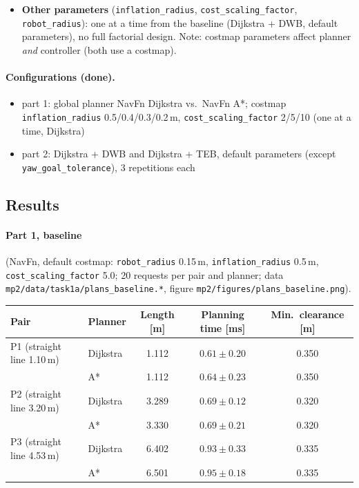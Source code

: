 \documentclass[10pt]{article}
\newcommand{\pkg}[1]{\texttt{#1}}
\begin{document}
\begin{itemize}
\begin{itemize}
                valid), recoveries, goal aborted. Weakness of plan-once; with 1\,Hz replanning this would not occur.
          \item \pkg{xy\_goal\_tolerance} 0.25\,m kept: start and end of a run differ from the pair coordinates
                by up to 0.25\,m, so the planned lengths differ from part 1.
        \end{itemize}
  \item \textbf{Other parameters} (\pkg{inflation\_radius}, \pkg{cost\_scaling\_factor}, \pkg{robot\_radius}):
        one at a time from the baseline (Dijkstra + DWB, default parameters), no full factorial design.
        Note: costmap parameters affect planner \emph{and} controller (both use a costmap).
\end{itemize}

\paragraph{Configurations (done).}
\begin{itemize}
  \item part 1: global planner NavFn Dijkstra vs.\ NavFn A*; costmap \pkg{inflation\_radius} 0.5/0.4/0.3/0.2\,m,
        \pkg{cost\_scaling\_factor} 2/5/10 (one at a time, Dijkstra)
  \item part 2: Dijkstra + DWB and Dijkstra + TEB, default parameters (except \pkg{yaw\_goal\_tolerance}),
        3 repetitions each
\end{itemize}

\subsection{Results}
\paragraph{Part 1, baseline} (NavFn, default costmap: \pkg{robot\_radius} 0.15\,m, \pkg{inflation\_radius} 0.5\,m,
\pkg{cost\_scaling\_factor} 5.0; 20 requests per pair and planner; data \pkg{mp2/data/task1a/plans\_baseline.*},
figure \pkg{mp2/figures/plans\_baseline.png}).

\begin{tabular}{llccc}
\toprule
Pair & Planner & Length [m] & Planning time [ms] & Min.\ clearance [m] \\
\midrule
P1 (straight line 1.10\,m) & Dijkstra & 1.112 & $0.61 \pm 0.20$ & 0.350 \\
                           & A*       & 1.112 & $0.64 \pm 0.23$ & 0.350 \\
P2 (straight line 3.20\,m) & Dijkstra & 3.289 & $0.69 \pm 0.12$ & 0.320 \\
                           & A*       & 3.330 & $0.69 \pm 0.21$ & 0.320 \\
P3 (straight line 4.53\,m) & Dijkstra & 6.402 & $0.93 \pm 0.33$ & 0.335 \\
                           & A*       & 6.501 & $0.95 \pm 0.18$ & 0.335 \\
\bottomrule
\end{tabular}
\end{document}
